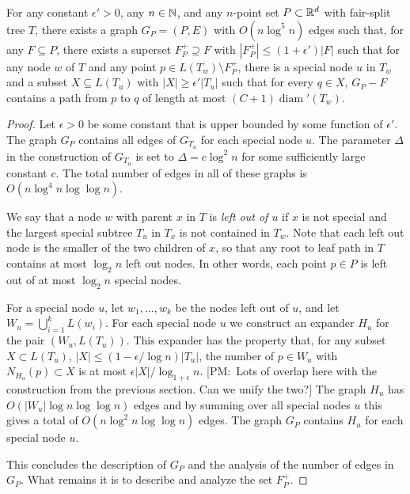 \documentclass{patmorin}
\newcommand{\note}[2]{{\color{red}[#1:~#2]}}
\DeclareMathOperator{\diam}{diam}
\begin{document}
\begin{lem}
  For any constant $\epsilon' >0$, any $n\in\mathbb{N}$, and any $n$-point
  set $P\subset\mathbb{R}^d$ with fair-split tree $T$, there exists a graph
  $G_P=(P,E)$ with $O(n\log^5 n)$ edges such that, for any $F\subseteq
  P$, there exists a superset $F^+_P\supseteq F$ with $|F^+_P|\le
  (1+\epsilon')|F|$ such that for any node $w$ of $T$ and any point
  $p\in L(T_w)\setminus F^+_P$, there is a special node $u$ in $T_w$
  and a subset $X\subseteq L(T_u)$
  with $|X|\ge \epsilon'|T_u|$ such that for every $q\in X$, $G_P-F$
  contains a path from $p$ to $q$ of length at most $(C+1)\diam'(T_w)$.
\end{lem}


\begin{proof}
  Let $\epsilon >0$ be some constant that is upper bounded by some
  function of $\epsilon'$.  The graph $G_P$ contains all edges of
  $G_{T_u}$ for each special node $u$.  The parameter $\Delta$ in
  the construction of $G_{T_u}$ is set to $\Delta=c\log^2 n$ for some
  sufficiently large constant $c$.  The total number of edges in all of
  these graphs is $O(n\log^4 n\log\log n)$.

  We say that a node $w$ with parent $x$ in $T$ is \emph{left out of
  $u$} if $x$ is not special and the largest special subtree $T_u$
  in $T_x$ is not contained in $T_w$.  Note that each left out node is
  the smaller of the two children of $x$, so that any root to leaf
  path in $T$ contains at most $\log_2 n$ left out nodes.  In other words,
  each point $p\in P$ is left out of at most $\log_2 n$ special nodes.
	
  For a special node $u$, let $w_1,\ldots,w_k$ be the nodes left out of $u$, and  let $W_u=\bigcup_{i=1}^k L(w_i)$.  For each special node $u$ we construct
  an expander $H_u$ for the pair
  $(W_u,L(T_u))$. This expander has the property that, for any
  subset $X\subset L(T_u)$, $|X|\le (1-\epsilon/\log n)|T_u|$, the number of $p\in W_u$
  with $N_{H_u}(p)\subset X$ is at most $\epsilon|X|/\log_{1+\epsilon} n$.
  \note{PM}{Lots of overlap here with the construction from the previous
  section. Can we unify the two?}  The graph $H_u$ has $O(|W_u|\log n\log\log
  n)$ edges and by summing over all special nodes $u$ this gives a total of
  $O(n\log^2 n\log\log n)$ edges.  The graph $G_P$ contains $H_u$
  for each special node $u$.

  This concludes the description of $G_P$ and the analysis of the number
  of edges in $G_P$. What remains it is to describe and analyze the
  set $F^+_P$.



\end{proof}
\end{document}

